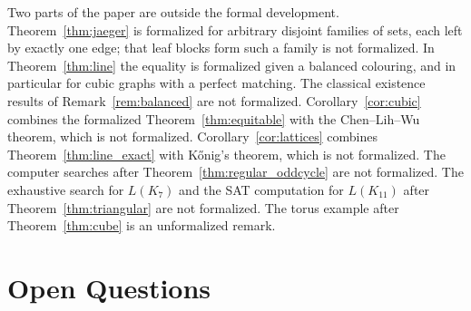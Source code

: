\documentclass{article}
\theoremstyle{definition}
\begin{document}
Two parts of the paper are outside the formal development.  Theorem~\ref{thm:jaeger}
is formalized for arbitrary disjoint families of sets, each left by exactly one
edge; that leaf blocks form such a family is not formalized.  In
Theorem~\ref{thm:line} the equality is formalized given a balanced colouring,
and in particular for cubic graphs with a perfect matching.  The classical
existence results of Remark~\ref{rem:balanced} are not formalized.  Corollary~\ref{cor:cubic}
combines the formalized Theorem~\ref{thm:equitable} with the Chen--Lih--Wu
theorem, which is not formalized.  Corollary~\ref{cor:lattices} combines
Theorem~\ref{thm:line_exact} with K\H{o}nig's theorem, which is not formalized.  The computer searches after
Theorem~\ref{thm:regular_oddcycle} are not formalized.  The exhaustive search for $L(K_7)$ and the SAT computation for $L(K_{11})$ after
Theorem~\ref{thm:triangular} are not formalized.  The torus example after
Theorem~\ref{thm:cube} is an unformalized remark.

\section{Open Questions}
\label{sec:open}
\end{document}

